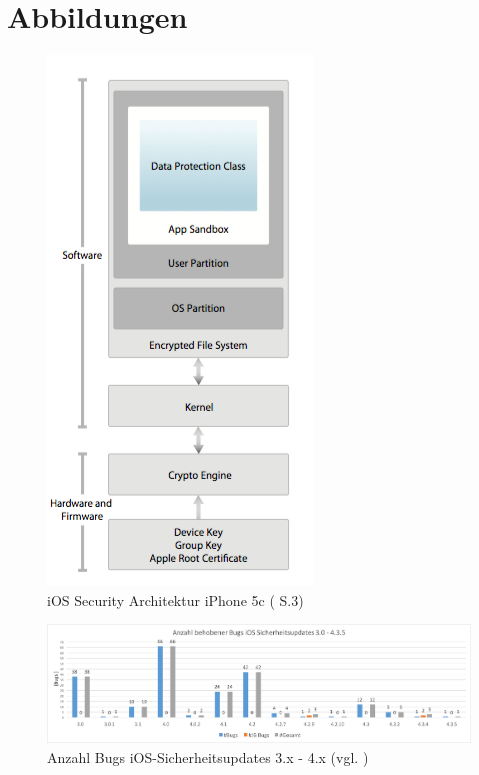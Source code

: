\newpage
\chapter{Abbildungen}

\begin{figure}[htbp!]
    \centering 
		        \includegraphics[scale=0.3]{Bilder/SecArchitektur-iOS7.png}
	\caption {iOS Security Architektur iPhone 5c (\cite{Apple[9]} S.3) } 
    \label{fig:iOSSecurityArchitekturiOS7}
\end{figure}
\begin{figure}[htbp!]
        \centering
                \includegraphics[scale=0.4]{Bilder/iOSSicherheitsupdate3.png}
        \caption{Anzahl Bugs iOS-Sicherheitsupdates 3.x - 4.x  (vgl. \cite{Apple[7]}) \protect\footnotemark}
        \label{fig:AnalyseiOSSicherheitsupdate3}
\end{figure}

